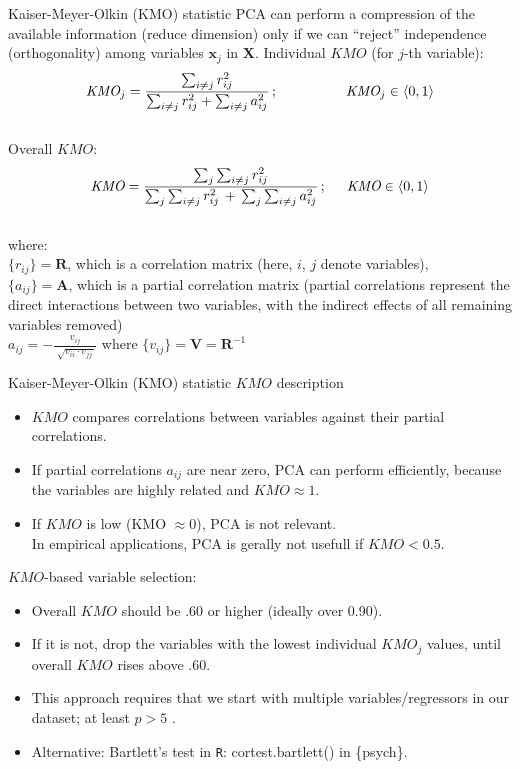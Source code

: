 \documentclass{beamer}
\begin{document}
\begin{frame}{Kaiser-Meyer-Olkin (KMO) statistic}
PCA can perform a compression of the available information (reduce dimension) only if we can ``reject''  independence (orthogonality) among variables $\bm{x}_j$ in $\bm{X}$.
\bigskip
Individual $\textit{KMO}$ (for $j$-th variable):
$$\textit{KMO}_j = \frac{\sum_{i\neq j} r_{ij}^2}{\sum_{i\neq j} r_{ij}^2 + \sum_{i\neq j} a_{ij}^2}\,;\hspace{1,7cm} \textit{KMO}_j \in \langle 0,1 \rangle $$\\
Overall $\textit{KMO}$:
$$\textit{KMO} = \frac{\sum_j \sum_{i\neq j} r_{ij}^2}
                   {\sum_j \sum_{i\neq j} r_{ij}^2 \,+\, \sum_j \sum_{i\neq j} a_{ij}^2}\,
                   ;\hspace{0.5cm} \textit{KMO} \in \langle 0,1 \rangle $$\\

where:\\
$\{r_{ij} \} = \bm{R}$, which is a correlation matrix (here, $i$, $j$ denote variables),\\
$\{a_{ij} \} = \bm{A}$, which is a partial correlation matrix (partial correlations represent the direct interactions between two variables, with the indirect effects of all remaining variables removed)\\
$a_{ij} = - \frac{v_{ij}}{\sqrt[]{v_{ii} \cdot v_{jj}\,}}$ where $\{ v_{ij} \} = \bm{V} = \bm{R}^{-1}$
\end{frame}
\begin{frame}{Kaiser-Meyer-Olkin (KMO) statistic}
$\textit{KMO}$ description 
\begin{itemize}
\item $\textit{KMO}$ compares  correlations between variables against their partial correlations. 
\item If partial correlations $a_{ij}$ are near zero, PCA can perform efficiently, because the
variables are highly related and $\textit{KMO} \approx 1$.
\item If $\textit{KMO}$ is low (KMO $\approx 0$), PCA is not relevant.\\In empirical applications, PCA is gerally not usefull if $\textit{KMO} < 0.5$.
\end{itemize}
\bigskip
$\textit{KMO}$-based variable selection:
\smallskip
\begin{itemize}
\item Overall $\textit{KMO}$ should be .60 or higher (ideally over 0.90).
\item If it is not, drop the variables with the lowest individual $\textit{KMO}_j$ values, until overall $\textit{KMO}$ rises above .60.
\item This approach requires that we start with multiple variables/regressors in our dataset; at least $p > 5$ .
\item Alternative: Bartlett’s test in \texttt{R}: cortest.bartlett() in \{psych\}.
\end{itemize}
\end{frame}
\end{document}
